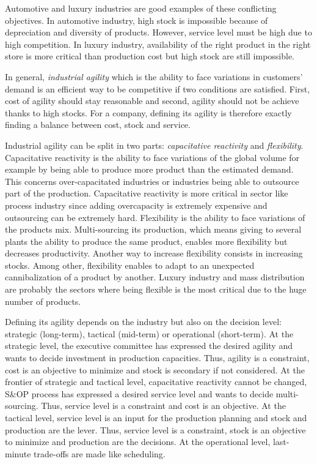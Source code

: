 \medskip


Automotive and luxury industries are good examples of these conflicting objectives.
In automotive industry, high stock is impossible because of depreciation and diversity of products.
However, service level must be high due to high competition.
In luxury industry, availability of the right product in the right store is more critical than production cost but high stock are still impossible.


In general, \emph{industrial agility} which is the ability to face variations in customers' demand is an efficient way to be competitive if two conditions are satisfied.
First, cost of agility should stay reasonable and second, agility should not be achieve thanks to high stocks.
For a company, defining its agility is therefore exactly finding a balance between cost, stock and service.


Industrial agility can be split in two parts: \emph{capacitative reactivity} and \emph{flexibility}.
Capacitative reactivity is the ability to face variations of the global volume for example by being able to produce more product than the estimated demand.
This concerns over-capacitated industries or industries being able to outsource part of the production.
Capacitative reactivity is more critical in sector like process industry since adding overcapacity is extremely expensive and outsourcing can be extremely hard.
Flexibility is the ability to face variations of the products mix.
Multi-sourcing its production, which means giving to several plants the ability to produce the same product, enables more flexibility but decreases productivity.
Another way to increase flexibility consists in increasing stocks.
Among other, flexibility enables to adapt to an unexpected cannibalization of a product by another.
Luxury industry and mass distribution are probably the sectors where being flexible is the most critical due to the huge number of products.


Defining its agility depends on the industry but also on the decision level: strategic (long-term), tactical (mid-term) or operational (short-term).
At the strategic level, the executive committee has expressed the desired agility and wants to decide investment in production capacities.
Thus, agility is a constraint, cost is an objective to minimize and stock is secondary if not considered.
At the frontier of strategic and tactical level, capacitative reactivity cannot be changed, S\&OP process has expressed a desired service level and wants to decide multi-sourcing.
Thus, service level is a constraint and cost is an objective.
At the tactical level, service level is an input for the production planning and stock and production are the lever.
Thus, service level is a constraint, stock is an objective to minimize and production are the decisions.
At the operational level, last-minute trade-offs are made like scheduling.



